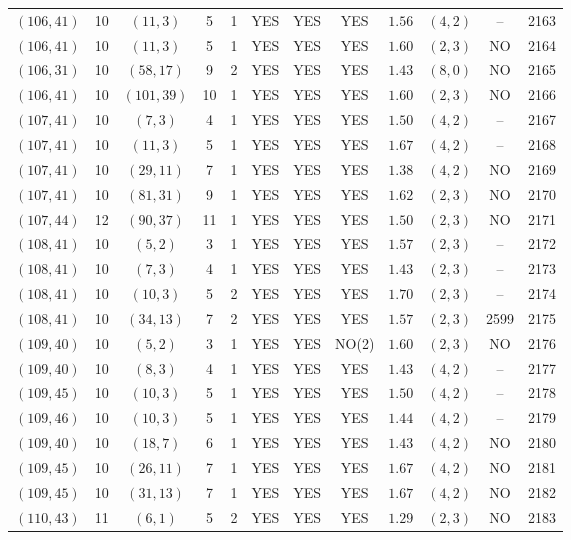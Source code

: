 \begin{longtable}{|c|c|c|c|c|c|c|c|c|c|c|c|}
$(106,41)$ & 10 & $(11,3)$ & 5 & 1 & YES & YES & YES & $1.56$ & $(4,2)$ & -- & 2163\\
$(106,41)$ & 10 & $(11,3)$ & 5 & 1 & YES & YES & YES & $1.60$ & $(2,3)$ & NO & 2164\\
$(106,31)$ & 10 & $(58,17)$ & 9 & 2 & YES & YES & YES & $1.43$ & $(8,0)$ & NO & 2165\\
$(106,41)$ & 10 & $(101,39)$ & 10 & 1 & YES & YES & YES & $1.60$ & $(2,3)$ & NO & 2166\\
$(107,41)$ & 10 & $(7,3)$ & 4 & 1 & YES & YES & YES & $1.50$ & $(4,2)$ & -- & 2167\\
$(107,41)$ & 10 & $(11,3)$ & 5 & 1 & YES & YES & YES & $1.67$ & $(4,2)$ & -- & 2168\\
$(107,41)$ & 10 & $(29,11)$ & 7 & 1 & YES & YES & YES & $1.38$ & $(4,2)$ & NO & 2169\\
$(107,41)$ & 10 & $(81,31)$ & 9 & 1 & YES & YES & YES & $1.62$ & $(2,3)$ & NO & 2170\\
$(107,44)$ & 12 & $(90,37)$ & 11 & 1 & YES & YES & YES & $1.50$ & $(2,3)$ & NO & 2171\\
$(108,41)$ & 10 & $(5,2)$ & 3 & 1 & YES & YES & YES & $1.57$ & $(2,3)$ & -- & 2172\\
$(108,41)$ & 10 & $(7,3)$ & 4 & 1 & YES & YES & YES & $1.43$ & $(2,3)$ & -- & 2173\\
$(108,41)$ & 10 & $(10,3)$ & 5 & 2 & YES & YES & YES & $1.70$ & $(2,3)$ & -- & 2174\\
$(108,41)$ & 10 & $(34,13)$ & 7 & 2 & YES & YES & YES & $1.57$ & $(2,3)$ & 2599 & 2175\\
$(109,40)$ & 10 & $(5,2)$ & 3 & 1 & YES & YES & NO(2) & $1.60$ & $(2,3)$ & NO & 2176\\
$(109,40)$ & 10 & $(8,3)$ & 4 & 1 & YES & YES & YES & $1.43$ & $(4,2)$ & -- & 2177\\
$(109,45)$ & 10 & $(10,3)$ & 5 & 1 & YES & YES & YES & $1.50$ & $(4,2)$ & -- & 2178\\
$(109,46)$ & 10 & $(10,3)$ & 5 & 1 & YES & YES & YES & $1.44$ & $(4,2)$ & -- & 2179\\
$(109,40)$ & 10 & $(18,7)$ & 6 & 1 & YES & YES & YES & $1.43$ & $(4,2)$ & NO & 2180\\
$(109,45)$ & 10 & $(26,11)$ & 7 & 1 & YES & YES & YES & $1.67$ & $(4,2)$ & NO & 2181\\
$(109,45)$ & 10 & $(31,13)$ & 7 & 1 & YES & YES & YES & $1.67$ & $(4,2)$ & NO & 2182\\
$(110,43)$ & 11 & $(6,1)$ & 5 & 2 & YES & YES & YES & $1.29$ & $(2,3)$ & NO & 2183\\

\end{longtable}
